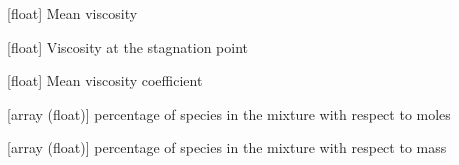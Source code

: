 \documentclass[letterpaper,10pt,english]{sphinxmanual}
\begin{document}
\begin{fulllineitems}
\begin{fulllineitems}
\end{fulllineitems}


\begin{fulllineitems}
\label{\detokenize{modules:assembly.Freestream.mu}}
\pysigstartsignatures
{}
\pysigstopsignatures
\sphinxAtStartPar
{[}float{]} Mean viscosity

\end{fulllineitems}


\begin{fulllineitems}
\label{\detokenize{modules:assembly.Freestream.mu_s}}
\pysigstartsignatures
{}
\pysigstopsignatures
\sphinxAtStartPar
{[}float{]} Viscosity at the stagnation point

\end{fulllineitems}


\begin{fulllineitems}
\label{\detokenize{modules:assembly.Freestream.omega}}
\pysigstartsignatures
{}
\pysigstopsignatures
\sphinxAtStartPar
{[}float{]} Mean viscosity coefficient

\end{fulllineitems}


\begin{fulllineitems}
\label{\detokenize{modules:assembly.Freestream.percent_gas}}
\pysigstartsignatures
{}
\pysigstopsignatures
\sphinxAtStartPar
{[}array (float){]} percentage of species in the mixture with respect to moles

\end{fulllineitems}


\begin{fulllineitems}
\label{\detokenize{modules:assembly.Freestream.percent_mass}}
\pysigstartsignatures
{}
\pysigstopsignatures
\sphinxAtStartPar
{[}array (float){]} percentage of species in the mixture with respect to mass


\end{fulllineitems}
\end{fulllineitems}
\end{document}
